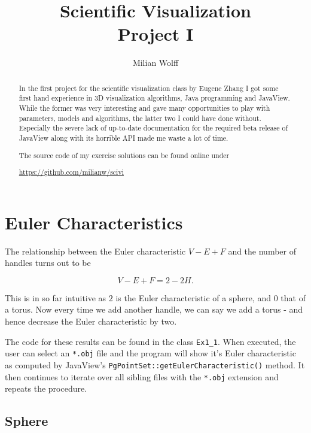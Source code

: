 \documentclass[a4paper,10pt,notitlepage]{scrreprt}
\title{Scientific Visualization\\Project I}
\author{Milian Wolff}
\begin{document}
\maketitle

\begin{abstract}
In the first project for the scientific visualization class by Eugene Zhang I
got some first hand experience in 3D visualization algorithms, Java programming
and JavaView. While the former was very interesting and gave many opportunities
to play with parameters, models and algorithms, the latter two I could have
done without. Especially the severe lack of up-to-date documentation for the
required beta release of JavaView along with its horrible API made me waste a
lot of time.

The source code of my exercise solutions can be found online under

\begin{center}\url{https://github.com/milianw/scivi}\end{center}
\end{abstract}

\begingroup
\let\clearpage\relax

\tableofcontents
\endgroup

\chapter{Euler Characteristics}

The relationship between the Euler characteristic $V-E+F$ and the number of
handles turns out to be

\begin{equation}
 V-E+F = 2-2H .
 \label{eq:handle-euler}
\end{equation}

This is in so far intuitive as $2$ is the Euler characteristic of a sphere, and
$0$ that of a torus. Now every time we add another handle, we can say we add a
torus - and hence decrease the Euler characteristic by two.

The code for these results can be found in the class \texttt{Ex1\_1}. When
executed, the user can select an \texttt{*.obj} file and the program will
show it's Euler characteristic as computed by JavaView's
\texttt{PgPointSet::getEulerCharacteristic()} method. It then continues to
iterate over all sibling files with the \texttt{*.obj} extension and repeats the
procedure.

\section{Sphere}
\end{document}
